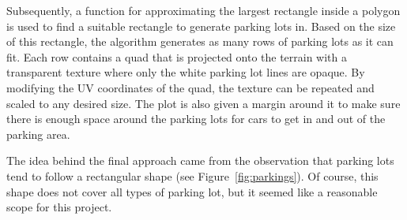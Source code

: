 Subsequently, a function for approximating the largest rectangle inside a polygon is used to find a suitable rectangle to generate parking lots in.
Based on the size of this rectangle, the algorithm generates as many rows of parking lots as it can fit.
Each row contains a quad that is projected onto the terrain with a transparent texture where only the white parking lot lines are opaque.
By modifying the UV coordinates of the quad, the texture can be repeated and scaled to any desired size. 
The plot is also given a margin around it to make sure there is enough space around the parking lots for cars to get in and out of the parking area.

The idea behind the final approach came from the observation that parking lots tend to follow a rectangular shape (see Figure~\ref{fig:parkings}).
Of course, this shape does not cover all types of parking lot, but it seemed like a reasonable scope for this project.

